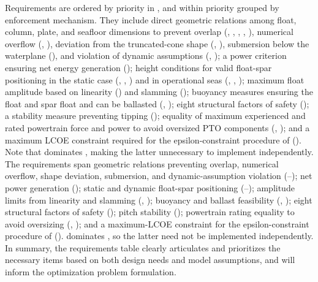 \ifdefined\DISSERTATION
    Requirements are ordered by priority in , and within priority grouped by enforcement mechanism.
    They include direct geometric relations among float, column, plate, and seafloor dimensions to prevent overlap (, , , , ), numerical overflow (, ), deviation from the truncated-cone shape (, ), submersion below the waterplane (), and violation of dynamic assumptions (, );
    a power criterion ensuring net energy generation ();
    height conditions for valid float-spar positioning in the static case (, , ) and in operational seas (, , );
    maximum float amplitude based on linearity () and slamming ();
    buoyancy measures ensuring the float and spar float and can be ballasted (, );
    eight structural factors of safety (); a stability measure preventing tipping ();
    equality of maximum experienced and rated powertrain force and power to avoid oversized PTO components (, );
    and a maximum LCOE constraint required for the epsilon-constraint procedure of  ().
    Note that  dominates , making the latter unnecessary to implement independently.
\else
    The requirements span geometric relations preventing overlap, numerical overflow, shape deviation, submersion, and dynamic-assumption violation (--);
    net power generation (); static and dynamic float-spar positioning (--);
    amplitude limits from linearity and slamming (, );
    buoyancy and ballast feasibility (, );
    eight structural factors of safety (); pitch stability ();
    powertrain rating equality to avoid oversizing (, );
    and a maximum-LCOE constraint for the epsilon-constraint procedure of  (). 
     dominates , so the latter need not be implemented independently.
\fi
In summary, the requirements table clearly articulates and prioritizes the necessary items based on both design needs and model assumptions,
and will inform the optimization problem formulation.
